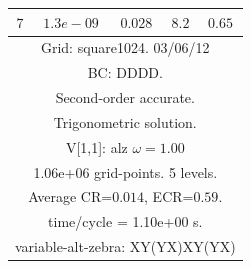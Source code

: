 \begin{table}[hbt]
\begin{center}
{\begin{tabular}{|c|c|c|c|c|}
 $ 7$  & $ 1.3e-09$ & $0.028$ & $ 8.2$ & $0.65$ \\ 
\hline 
\multicolumn{5}{|c|}{Grid: square1024. 03/06/12}  \\
\multicolumn{5}{|c|}{BC: DDDD.}  \\
\multicolumn{5}{|c|}{Second-order accurate.}  \\
\multicolumn{5}{|c|}{Trigonometric solution.}  \\
\multicolumn{5}{|c|}{V[1,1]: alz $\omega=1.00$}  \\
\multicolumn{5}{|c|}{1.06e+06 grid-points. 5 levels.}  \\
\multicolumn{5}{|c|}{Average CR=$0.014$, ECR=$0.59$.}  \\
\multicolumn{5}{|c|}{time/cycle = 1.10e+00 s.}  \\
\multicolumn{5}{|c|}{variable-alt-zebra: XY(YX)XY(YX)}  \\
\hline 
\end{tabular}
}
\end{center}
\end{table}
